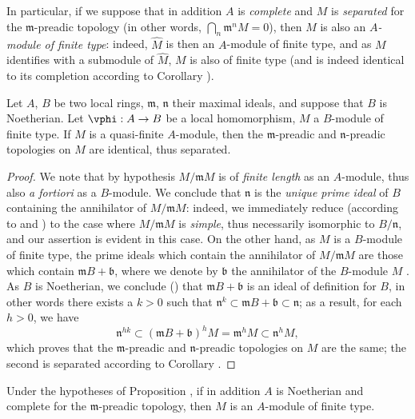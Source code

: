 In particular, if we suppose that in addition $A$ is \emph{complete} and $M$ is
\emph{separated} for the $\mathfrak{m}$-preadic topology (in other words,
$\bigcap_n\mathfrak{m}^n M=0$), then $M$ is also an \emph{$A$-module of finite type}: indeed,
$\widehat{M}$ is then an $A$-module of finite type, and as $M$ identifies with a submodule of
$\widehat{M}$, $M$ is also of finite type (and is indeed identical to its completion
according to Corollary ).

\begin{proposition}[7.4.2]
\label{0.7.4.2}
Let $A$, $B$ be two local rings, $\mathfrak{m}$, $\mathfrak{n}$ their maximal ideals, and
suppose that $B$ is Noetherian. Let $\vphi:A\to B$ be a local homomorphism, $M$ a $B$-module
of finite type. If $M$ is a quasi-finite $A$-module, then the $\mathfrak{m}$-preadic and
$\mathfrak{n}$-preadic topologies on $M$ are identical, thus separated.
\end{proposition}

\begin{proof}
\label{proof-0.7.4.2}
We note that by hypothesis $M/\mathfrak{m}M$ is of \emph{finite length} as an $A$-module,
thus also \emph{a fortiori} as a $B$-module. We conclude that $\mathfrak{n}$ is the
\emph{unique prime ideal} of $B$ containing the annihilator of $M/\mathfrak{m}M$: indeed, we
immediately reduce (according to  and
) to the case where $M/\mathfrak{m}M$ is \emph{simple}, thus
necessarily isomorphic to $B/\mathfrak{n}$, and our assertion is evident in this case. On
the other hand, as $M$ is a $B$-module of finite type, the prime ideals which contain the
annihilator of $M/\mathfrak{m}M$ are those which contain $\mathfrak{m}B+\mathfrak{b}$, where
we denote by $\mathfrak{b}$ the annihilator of the $B$-module $M$
. As $B$ is Noetherian, we conclude
(\cite[p.~127, Cor.~4]{I-11}) that $\mathfrak{m}B+\mathfrak{b}$ is an ideal
of definition for $B$, in other words there exists a $k>0$ such that
$\mathfrak{n}^k\subset\mathfrak{m}B+\mathfrak{b}\subset\mathfrak{n}$; as a result, for each
$h>0$, we have
\[
  \mathfrak{n}^{hk}\subset(\mathfrak{m}B+\mathfrak{b})^h M
  =\mathfrak{m}^h M\subset\mathfrak{n}^h M,
\]
which proves that the $\mathfrak{m}$-preadic and $\mathfrak{n}$-preadic topologies on $M$
are the same; the second is separated according to Corollary .
\end{proof}

\begin{corollary}[7.4.3]
\label{0.7.4.3}
Under the hypotheses of Proposition , if in addition $A$ is
Noetherian and complete for the $\mathfrak{m}$-preadic topology, then $M$ is an $A$-module
of finite type.
\end{corollary}

